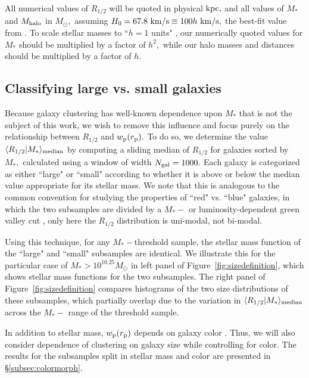 \documentclass[usenatbib,usegraphicx,letterpaper]{mn2e}
\newcommand{\rhalf}{R_{1/2}}
\newcommand{\mstar}{M_{\ast}}
\newcommand{\mhalo}{M_{\rm halo}}
\newcommand{\rproj}{r_{\rm p}}
\newcommand{\wproj}{w_{\rm p}}
\newcommand{\median}[2]{\langle{#1}\vert{#2}\rangle_{\rm median}}
\newcommand{\kpc}{{\rm kpc}}
\newcommand{\msun}{M_\odot}
\newcommand{\kms}{{\rm km/s}}
\begin{document}
All numerical values of $\rhalf$ will be quoted in physical $\kpc,$ and all values of $\mstar$ and $\mhalo$ in $\msun,$ assuming $H_0=67.8~\kms\equiv100h~\kms,$ the best-fit value from \citet{planck15}. To scale stellar masses to ``$h=1$ units" \citep{croton13}, our numerically quoted values for $\mstar$ should be multiplied by a factor of $h^2,$ while our halo masses and distances should be multiplied by a factor of $h.$

\subsection{Classifying large vs. small galaxies}
\label{subsec:sizedef}

Because galaxy clustering has well-known dependence upon $\mstar$ that is not the subject of this work, we wish to remove this influence and focus purely on the relationship between $\rhalf$ and $\wproj(\rproj).$ To do so, we determine the value $\median{\rhalf}{\mstar}$ by computing a sliding median of $\rhalf$ for galaxies sorted by $\mstar,$ calculated using a window of width $N_{\rm gal}=1000.$ Each galaxy is categorized as either ``large" or ``small" according to whether it is above or below the median value appropriate for its stellar mass. We note that this is analogous to the common convention for studying the properties of ``red" vs. ``blue" galaxies, in which the two subsamples are divided by a $\mstar-$ or luminosity-dependent green valley cut \citep[e.g.,][]{vdB_etal08,zehavi_etal11}, only here the $\rhalf$ distribution is uni-modal, not bi-modal. 

Using this technique, for any $\mstar-$threshold sample, the stellar mass function of the ``large" and ``small" subsamples are identical. We illustrate this for the particular case of $\mstar>10^{10.25}\msun$ in left panel of Figure~\ref{fig:sizedefinition}, which shows stellar mass functions for the two subsamples. The right panel of Figure~\ref{fig:sizedefinition} compares histograms of the two size distributions of these subsamples, which partially overlap due to the variation in $\median{\rhalf}{\mstar}$ across the $\mstar-$ range of the threshold sample. 

In addition to stellar mass, $\wproj(\rproj)$ depends on galaxy color \citep[e.g.,][]{zehavi_etal11}. Thus, we will also consider 
dependence of clustering on galaxy size while controlling for color. The results for the subsamples split in stellar mass and color are presented in \S\ref{subsec:colormorph}. 
\end{document}
